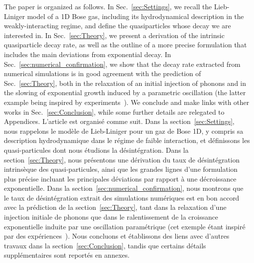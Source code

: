\documentclass[aps,prd,notitlepage,amsfonts,amssymb,amsmath,nofootinbib,superscriptaddress,longbibliography]{revtex4-2}
\newcommand{\trad}[1]{\textcolor{tradcolor}{#1}}
\begin{document}
The paper is organized as follows.
In Sec.~\ref{sec:Settings}, we recall the Lieb-Liniger model of a 1D Bose gas, including its hydrodynamical description in the weakly-interacting regime, and define the quasiparticles whose decay we are interested in.
In Sec.~\ref{sec:Theory}, we present a derivation of the intrinsic quasiparticle decay rate, as well as the outline of a more precise formulation that includes the main deviations from exponential decay.
In Sec.~\ref{sec:numerical_confirmation}, we show that the decay rate extracted from numerical simulations is in good agreement with the prediction of Sec.~\ref{sec:Theory}, both in the relaxation of an initial injection of phonons and in the slowing of exponential growth induced by a parametric oscillation (the latter example being inspired by experiments~\cite{Jaskula2012}).
We conclude and make links with other works in Sec.~\ref{sec:Conclusion}, while some further details are relegated to Appendices.
\trad{
L'article est organisé comme suit.
Dans la section~\ref{sec:Settings}, nous rappelons le modèle de Lieb-Liniger pour un gaz de Bose 1D, y compris sa description hydrodynamique dans le régime de faible interaction, et définissons les quasi-particules dont nous étudions la désintégration.
Dans la section~\ref{sec:Theory}, nous présentons une dérivation du taux de désintégration intrinsèque des quasi-particules, ainsi que les grandes lignes d'une formulation plus précise incluant les principales déviations par rapport à une décroissance exponentielle.
Dans la section~\ref{sec:numerical_confirmation}, nous montrons que le taux de désintégration extrait des simulations numériques est en bon accord avec la prédiction de la section~\ref{sec:Theory}, tant dans la relaxation d'une injection initiale de phonons que dans le ralentissement de la croissance exponentielle induite par une oscillation paramétrique (cet exemple étant inspiré par des expériences~\cite{Jaskula2012}).
Nous concluons et établissons des liens avec d'autres travaux dans la section~\ref{sec:Conclusion}, tandis que certains détails supplémentaires sont reportés en annexes.
}
\end{document}
